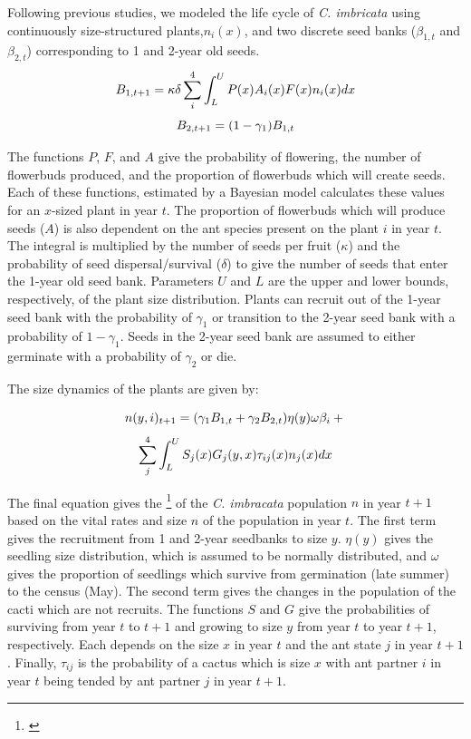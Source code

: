 \documentclass[12pt,a4paper]{article}
\newcommand{\tom}[2]{{\color{red}{#1}}\footnote{\textit{\color{red}{#2}}}}
\begin{document}
Following previous studies, we modeled the life cycle of \textit{C. imbricata} using continuously size-structured plants,$n_i(x)$, and two discrete seed banks ($\beta_{1,t}$ and $\beta_{2,t}$) corresponding to 1 and 2-year old seeds.
$$
B_{1, t+1} = \kappa \delta \sum_{i}^{4} \int_L^U P(x) A_i(x) F(x)n_i(x) dx \\
$$
$$
B_{2,t+1} =  (1 - \gamma_1)B_{1,t}\\
$$

The functions $P$, $F$, and $A$ give the probability of flowering, the number of flowerbuds produced, and the proportion of flowerbuds which will create seeds. 
Each of these functions, estimated by a Bayesian model calculates these values for an $x$-sized plant in year $t$. 
The proportion of flowerbuds which will produce seeds ($A$) is also dependent on the ant species present on the plant $i$ in year $t$. 
The integral is multiplied by the number of seeds per fruit ($\kappa$) and the probability of seed dispersal/survival ($\delta$) to give the number of seeds that enter the 1-year old seed bank. 
Parameters $U$ and $L$ are the upper and lower  bounds, respectively, of the plant size distribution. 
Plants can recruit out of the 1-year seed bank with the probability of $\gamma_1$ or transition to the 2-year seed bank with a probability of $1 - \gamma_1$. 
Seeds in the 2-year seed bank are assumed to either germinate with a probability of $\gamma_2$ or die. 

The size dynamics of the plants are given by:

$$
n(y,i)_{t+1} = (\gamma_1 B_{1,t} + \gamma_2 B_{2,t}) \eta(y) \omega \beta_i  + \\
$$
$$
\sum_{j}^{4} \int_L^U S_j(x) G_j(y,x) \tau_{ij}(x) n_j(x) dx \\
$$

The final equation gives the \tom{size}{not just population size but also composition in terms of size and ant state - this needs to be explained better} of the \textit{C. imbracata} population $n$ in year $t+1$ based on the vital rates and size $n$ of the population in year $t$.
The first term gives the recruitment from 1 and 2-year seedbanks to size $y$.
$\eta(y)$ gives the seedling size distribution, which is assumed to be normally distributed, and $\omega$ gives the proportion of seedlings which survive from germination (late summer) to the census (May). 
The second term gives the changes in the population of the cacti which are not recruits. 
The functions $S$ and $G$ give the probabilities of surviving from year $t$ to $t+1$ and growing to size $y$ from year $t$ to year $t+1$, respectively. 
Each depends on the size $x$ in year $t$ and the ant state $j$ in year $t+1$. 
Finally, $\tau_{ij}$ is the probability of a cactus which is size $x$ with ant partner $i$ in year $t$ being tended by ant partner $j$ in year $t+1$. 
\end{document}
